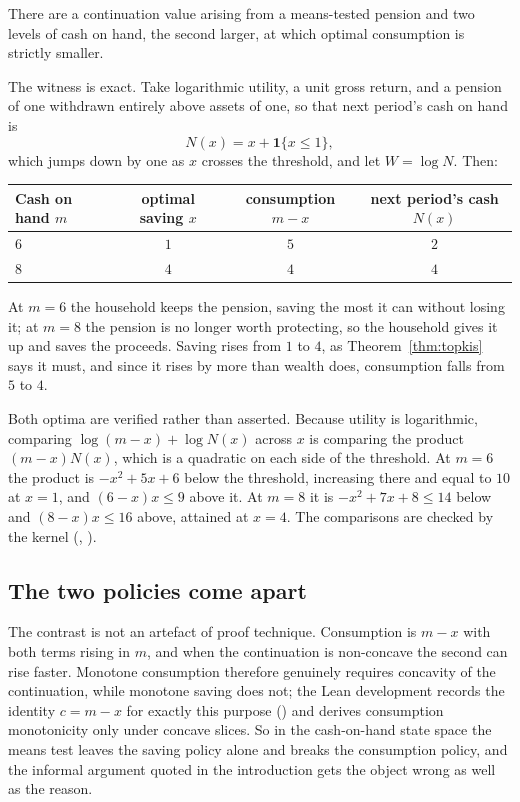 \begin{theorem}\label{thm:cons}
There are a continuation value arising from a means-tested pension and two levels of cash on hand,
the second larger, at which optimal consumption is strictly smaller.
\end{theorem}

The witness is exact. Take logarithmic utility, a unit gross return, and a pension of one
withdrawn entirely above assets of one, so that next period's cash on hand is
\[
  N(x)=x+\mathbf{1}\{x\le1\},
\]
which jumps down by one as $x$ crosses the threshold, and let $W=\log N$. Then:

\begingroup\small
\begin{center}
\begin{tabular}{@{}lccc@{}}
\toprule
Cash on hand $m$ & optimal saving $x$ & consumption $m-x$ & next period's cash $N(x)$\\
\midrule
$6$ & $1$ & $5$ & $2$\\
$8$ & $4$ & $4$ & $4$\\
\bottomrule
\end{tabular}
\end{center}
\endgroup

At $m=6$ the household keeps the pension, saving the most it can without losing it; at $m=8$ the
pension is no longer worth protecting, so the household gives it up and saves the proceeds. Saving
rises from $1$ to $4$, as Theorem~\ref{thm:topkis} says it must, and since it rises by more than
wealth does, consumption falls from $5$ to $4$.

Both optima are verified rather than asserted. Because utility is logarithmic, comparing
$\log(m-x)+\log N(x)$ across $x$ is comparing the product $(m-x)N(x)$, which is a quadratic on each
side of the threshold. At $m=6$ the product is $-x^2+5x+6$ below the threshold, increasing there
and equal to $10$ at $x=1$, and $(6-x)x\le9$ above it. At $m=8$ it is $-x^2+7x+8\le14$ below and
$(8-x)x\le16$ above, attained at $x=4$. The comparisons are checked by the kernel
(, ).

\subsection{The two policies come apart}

The contrast is not an artefact of proof technique. Consumption is $m-x$ with both terms rising in
$m$, and when the continuation is non-concave the second can rise faster. Monotone consumption
therefore genuinely requires concavity of the continuation, while monotone saving does not; the
Lean development records the identity $c=m-x$ for exactly this purpose
() and derives consumption monotonicity only under concave slices.
So in the cash-on-hand state space the means test leaves the saving policy alone and breaks the
consumption policy, and the informal argument quoted in the introduction gets the object wrong as
well as the reason.
